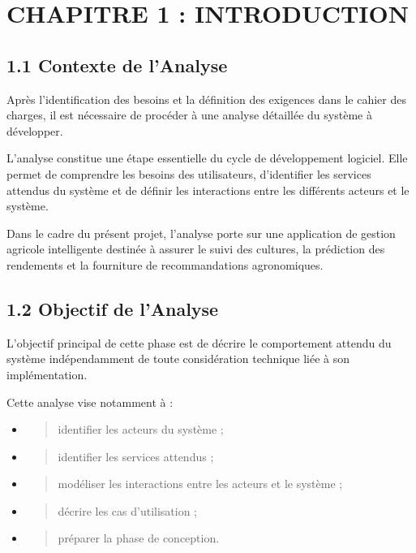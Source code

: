 \documentclass[
]{article}
\author{}
\date{}
\begin{document}
\hypertarget{chapitre-1-introduction}{%
\section{CHAPITRE 1 : INTRODUCTION}\label{chapitre-1-introduction}}

\hypertarget{contexte-de-lanalyse}{%
\subsection{1.1 Contexte de l'Analyse}\label{contexte-de-lanalyse}}

Après l'identification des besoins et la définition des exigences dans
le cahier des charges, il est nécessaire de procéder à une analyse
détaillée du système à développer.

L'analyse constitue une étape essentielle du cycle de développement
logiciel. Elle permet de comprendre les besoins des utilisateurs,
d'identifier les services attendus du système et de définir les
interactions entre les différents acteurs et le système.

Dans le cadre du présent projet, l'analyse porte sur une application de
gestion agricole intelligente destinée à assurer le suivi des cultures,
la prédiction des rendements et la fourniture de recommandations
agronomiques.

\hypertarget{objectif-de-lanalyse}{%
\subsection{1.2 Objectif de l'Analyse}\label{objectif-de-lanalyse}}

L'objectif principal de cette phase est de décrire le comportement
attendu du système indépendamment de toute considération technique liée
à son implémentation.

Cette analyse vise notamment à :

\begin{itemize}
\item
  \begin{quote}
  identifier les acteurs du système ;
  \end{quote}
\item
  \begin{quote}
  identifier les services attendus ;
  \end{quote}
\item
  \begin{quote}
  modéliser les interactions entre les acteurs et le système ;
  \end{quote}
\item
  \begin{quote}
  décrire les cas d'utilisation ;
  \end{quote}
\item
  \begin{quote}
  préparer la phase de conception.
  \end{quote}
\end{itemize}
\end{document}
